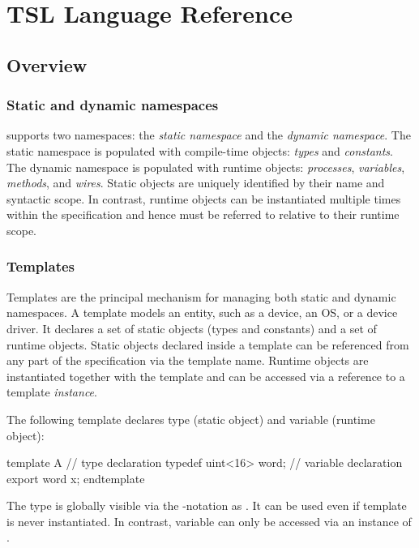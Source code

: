 \chapter{TSL Language Reference}
\label{ch:tsl_ref}

\section{Overview}

\subsection{Static and dynamic namespaces}\label{s:o:namespace}

\tsl supports two namespaces: the \emph{static namespace} and the 
\emph{dynamic namespace}.  The static namespace is populated with 
compile-time objects: \emph{types} and \emph{constants}.  The 
dynamic namespace is populated with runtime objects: 
\emph{processes}, \emph{variables}, \emph{methods}, and 
\emph{wires}.  Static objects are uniquely identified by their 
name and syntactic scope.  In contrast, runtime objects can be 
instantiated multiple times within the specification and hence 
must be referred to relative to their runtime scope.  

\subsection{Templates}\label{s:o:templates}

Templates are the principal mechanism for managing both static and 
dynamic namespaces.  A template models an entity, such as a 
device, an OS, or a device driver.  It declares a set of static 
objects (types and constants) and a set of runtime objects.  
Static objects declared inside a template can be referenced from 
any part of the specification via the template name.  Runtime 
objects are instantiated together with the template and can be 
accessed via a reference to a template \emph{instance}.

The following template declares type  (static object) 
and variable  (runtime object):
\begin{tsllisting2}
template A
  // type declaration
  typedef uint<16> word;
  // variable declaration
  export word x;
endtemplate
\end{tsllisting2}
The  type is globally visible via the \src{::}-notation 
as .  It can be used even if template  is 
never instantiated.  In contrast, variable  can only be 
accessed via an instance of .  

